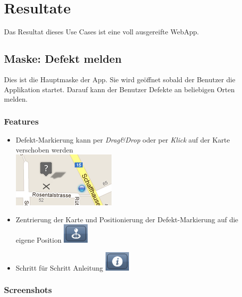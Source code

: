 \section{Resultate}
Das Resultat dieses Use Cases ist eine voll ausgereifte WebApp. 

\subsection{Maske: Defekt melden}
Dies ist die Hauptmaske der App. Sie wird geöffnet sobald der Benutzer die Applikation startet. Darauf kann der Benutzer Defekte an beliebigen Orten melden.

\subsubsection{Features}
\begin{itemize}
\item Defekt-Markierung kann per \emph{Drag\&Drop} oder per \emph{Klick} auf der Karte verschoben werden \\ \includegraphics{images/usecase2-fixmystreet/features/features-report-drag_and_drop}
\item Zentrierung der Karte und Positionierung der Defekt-Markierung auf die eigene Position \includegraphics{images/usecase2-fixmystreet/features/features-report-center_map_button}
\item Schritt für Schritt Anleitung \includegraphics{images/usecase2-fixmystreet/features/features-report-info_button}
\end{itemize}

\subsubsection{Screenshots}

